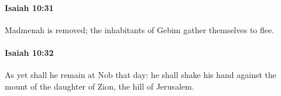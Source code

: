 		\paragraph{Isaiah 10:31} %
			\label{ISAIAH-10-31}

			Madmenah is removed; the inhabitants of Gebim gather themselves to flee.


		\paragraph{Isaiah 10:32} %
			\label{ISAIAH-10-32}

			As yet shall he remain at Nob that day: he shall shake his hand against the mount of the daughter of Zion, the hill of Jerusalem.


